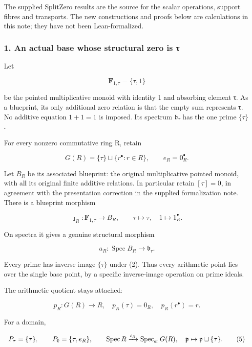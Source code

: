 \documentclass{article}
\begin{document}
The supplied SplitZero results are the source for the scalar operations, support fibres and transports. The new constructions and proofs below are calculations in this note; they have not been Lean-formalized.

\subsubsection{1. An actual base whose structural zero is τ}\label{endpoint-tau_base--an-actual-base-whose-structural-zero-is-ux3c4}

Let

\[
\mathbf F_{1,\tau}=\{\tau,1\}
\]

be the pointed multiplicative monoid with identity 1 and absorbing element τ. As a blueprint, its only additional zero relation is that the empty sum represents τ. No additive equation \(1+1=1\) is imposed. Its spectrum \(\mathfrak b_\tau\) has the one prime \(\{\tau\}\).

For every nonzero commutative ring R, retain

\[
G(R)=\{\tau\}\sqcup\{r^\bullet:r\in R\},\qquad e_R=0_R^\bullet.
\tag{1}
\]

Let \(B_R\) be its associated blueprint: the original multiplicative pointed monoid, with all its original finite additive relations. In particular retain \([\tau]=0\), in agreement with the presentation correction in the supplied formalization note. There is a blueprint morphism

\[
\jmath_R:\mathbf F_{1,\tau}\longrightarrow B_R,
\qquad \tau\mapsto\tau,\quad1\mapsto1_R^\bullet.
\tag{2}
\]

On spectra it gives a genuine structural morphism

\[
a_R:\operatorname{Spec}B_R\longrightarrow\mathfrak b_\tau.
\tag{3}
\]

Every prime has inverse image \(\{\tau\}\) under (2). Thus every arithmetic point lies over the single base point, by a specific inverse-image operation on prime ideals.

The arithmetic quotient stays attached:

\[
p_R:G(R)\longrightarrow R,
\quad p_R(\tau)=0_R,\quad p_R(r^\bullet)=r.
\tag{4}
\]

For a domain,

\[
P_\tau=\{\tau\},\qquad P_0=\{\tau,e_R\},\qquad
\operatorname{Spec}R\xrightarrow{i_R}\operatorname{Spec}_{\rm sr}G(R),
\quad\mathfrak p\mapsto\mathfrak p\sqcup\{\tau\}.
\tag{5}
\]
\end{document}
